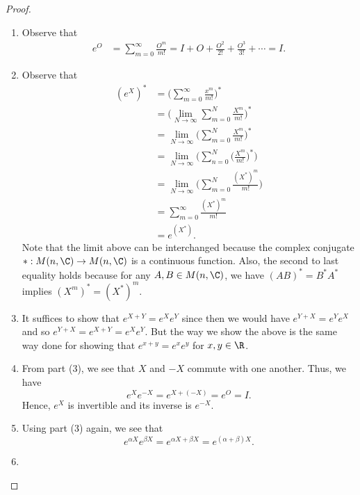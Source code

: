 \begin{proof}
    \begin{enumerate}
        \item[(1)] Observe that 
            \begin{align*}
                e^{O} &= \sum_{ m=0 }^{ \infty  } \frac{ O^{m} }{ m! } = I + O + \frac{ O^{2} }{ 2! }  + \frac{ O^{3} }{ 3! }  + \cdots  = I.
            \end{align*}
        \item[(2)] Observe that 
            \begin{align*}
                (e^{X})^{*} &= \Big(  \sum_{ m=0 }^{ \infty  } \frac{ x^{m} }{ m! }  \Big)^{*} \\
                            &= \Bigg(  \lim_{ N \to \infty  }  \sum_{ m=0 }^{ N } \frac{ X^{m} }{ m!  }  \Bigg)^{*} \\
                            &= \lim_{ N \to \infty  } \Big(  \sum_{ m=0 }^{ N } \frac{ X^{m} }{ m! }  \Big)^{*}  \\
                            &= \lim_{ N \to \infty  } \Big(  \sum_{ n=0 }^{ N } \Big( \frac{ X^{m} }{ m! }  \Big)^{*} \Big) \\
                            &= \lim_{ N \to \infty  } \Big(  \sum_{ m=0 }^{ N } \frac{ (X^{*})^{m} }{ m! }  \Big) \\
                            &= \sum_{ m=0 }^{ \infty  }\frac{ (X^{*})^{m} }{ m! }  \\
                            &= e^{(X^{*})}.
            \end{align*}
            Note that the limit above can be interchanged because the complex conjugate \(  *: M(n,\C) \to M(n,\C) \) is a continuous function. Also, the second to last equality holds because for any \( A,B \in M(n,\C) \), we have \( (AB)^{*} = B^{*}A^{*} \) implies \( (X^{m})^{*} = (X^{*})^{m} \).
        \item[(3)] It suffices to show that \( e^{X+Y} = e^{X} e^{Y} \) since then we would have \( e^{Y+X} = e^{Y} e^{X} \) and so \( e^{Y+X} = e^{X+Y} = e^{X} e^{Y} \). But the way we show the above is the same way done for showing that \( e^{x+y} = e^{x} e^{y} \) for \( x,y \in \R  \).
        \item[(4)] From part (3), we see that \( X  \) and \( -X \) commute with one another. Thus, we have  
            \[ e^{X} e^{-X} = e^{X + (-X)} = e^{O} = I.  \]
            Hence, \( e^{X} \) is invertible and its inverse is \( e^{-X} \).
        \item[(5)] Using part (3) again, we see that 
            \[ e^{\alpha X} e^{\beta X} = e^{\alpha X + \beta X} = e^{(\alpha + \beta)X}. \]
        \item[(6)]
    \end{enumerate}
\end{proof}
